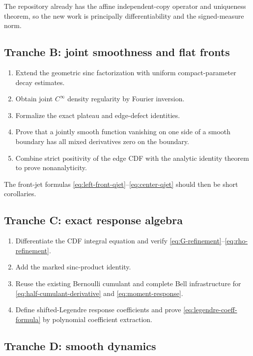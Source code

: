 \documentclass[11pt,oneside]{article}
\theoremstyle{definition}
\theoremstyle{remark}
\begin{document}
The repository already has the affine independent-copy operator and uniqueness theorem, so the
new work is principally differentiability and the signed-measure norm.

\subsection{Tranche B: joint smoothness and flat fronts}

\begin{enumerate}
\item Extend the geometric sinc factorization with uniform compact-parameter decay estimates.
\item Obtain joint \(C^\infty\) density regularity by Fourier inversion.
\item Formalize the exact plateau and edge-defect identities.
\item Prove that a jointly smooth function vanishing on one side of a smooth boundary has all
mixed derivatives zero on the boundary.
\item Combine strict positivity of the edge CDF with the analytic identity theorem to prove
nonanalyticity.
\end{enumerate}

The front-jet formulas \eqref{eq:left-front-qjet}--\eqref{eq:center-qjet} should then be short
corollaries.

\subsection{Tranche C: exact response algebra}

\begin{enumerate}
\item Differentiate the CDF integral equation and verify
\eqref{eq:G-refinement}--\eqref{eq:rho-refinement}.
\item Add the marked sinc-product identity.
\item Reuse the existing Bernoulli cumulant and complete Bell infrastructure for
\eqref{eq:half-cumulant-derivative} and \eqref{eq:moment-response}.
\item Define shifted-Legendre response coefficients and prove
\eqref{eq:legendre-coeff-formula} by polynomial coefficient extraction.
\end{enumerate}

\subsection{Tranche D: smooth dynamics}
\end{document}
